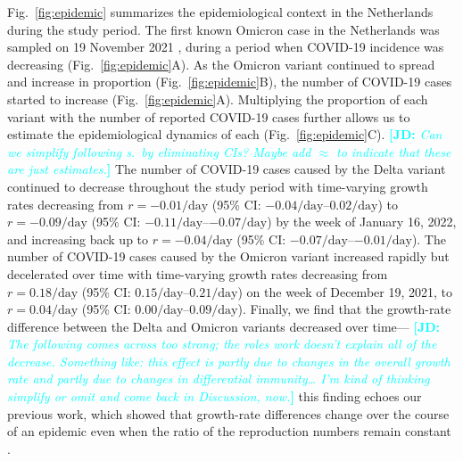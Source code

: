 \documentclass[12pt]{article}
\newcommand{\comment}{\showcomment}
\newcommand{\showcomment}[3]{\textcolor{#1}{\textbf{[#2: }\textsl{#3}\textbf{]}}}
\newcommand{\jd}[1]{\comment{cyan}{JD}{#1}}
\newcommand{\fref}[1]{Fig.~\ref{fig:#1}}
\begin{document}
\fref{epidemic} summarizes the epidemiological context in the Netherlands during the study period.
The first known Omicron case in the Netherlands was sampled on 19 November 2021 \citep{backer2021omicron}, during a period when COVID-19 incidence was decreasing (\fref{epidemic}A).
As the Omicron variant continued to spread and increase in proportion (\fref{epidemic}B), the number of COVID-19 cases started to increase (\fref{epidemic}A).
Multiplying the proportion of each variant with the number of reported COVID-19 cases further allows us to estimate the epidemiological dynamics of each (\fref{epidemic}C).
\jd{Can we simplify following s.~by eliminating CIs? Maybe add $\approx$ to indicate that these are just estimates.}
The number of COVID-19 cases caused by the Delta variant continued to decrease throughout the study period with time-varying growth rates decreasing from $r = -0.01/\mathrm{day}$ (95\% CI: $-0.04/\mathrm{day}$--$0.02/\mathrm{day}$) to $r = -0.09/\mathrm{day}$ (95\% CI: $-0.11/\mathrm{day}$--$-0.07/\mathrm{day}$) by the week of January 16, 2022, and increasing back up to $r = -0.04/\mathrm{day}$ (95\% CI: $-0.07/\mathrm{day}$--$-0.01/\mathrm{day}$).
The number of COVID-19 cases caused by the Omicron variant increased rapidly but decelerated over time with time-varying growth rates decreasing from $r=0.18/\mathrm{day}$ (95\% CI: $0.15/\mathrm{day}$--$0.21/\mathrm{day}$) on the week of December 19, 2021, to $r=0.04/\mathrm{day}$ (95\% CI: $0.00/\mathrm{day}$--$0.09/\mathrm{day}$).
Finally, we find that the growth-rate difference between the Delta and Omicron variants decreased over time---
\jd{The following comes across too strong; the roles work doesn't explain all of the decrease. Something like: this effect is partly due to changes in the overall growth rate and partly due to changes in differential immunity… I'm kind of thinking simplify or omit and come back in Discussion, now.}
this finding echoes our previous work, which showed that growth-rate differences change over the course of an epidemic even when the ratio of the reproduction numbers remain constant \citep{park2021roles}.
\end{document}
